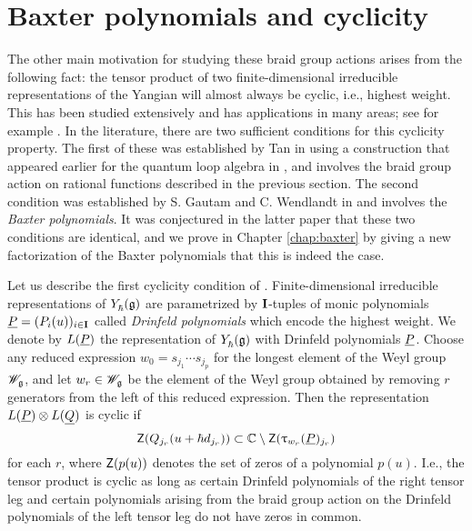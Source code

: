 \section{Baxter polynomials and cyclicity}

The other main motivation for studying these braid group actions arises from the following fact: the tensor product of two finite-dimensional irreducible representations of the Yangian will almost always be cyclic, i.e., highest weight.
This has been studied extensively and has applications in many areas; see for example \cite{chari_yangians_1996, guay_local_2015, molev_yangians_2007, nazarov_irreducibility_2002, akasaka_finite_1997}.
In the literature, there are two sufficient conditions for this cyclicity property.
The first of these was established by Tan in \cite{tan_braid_2015} using a construction that appeared earlier for the quantum loop algebra in \cite{chari_braid_2002}, and involves the braid group action on rational functions described in the previous section.
The second condition was established by S. Gautam and C. Wendlandt in \cite{gautam_poles_2023} and involves the \emph{Baxter polynomials}.
It was conjectured in the latter paper that these two conditions are identical, and we prove in Chapter \ref{chap:baxter} by giving a new factorization of the Baxter polynomials that this is indeed the case.

Let us describe the first cyclicity condition of \cite{tan_braid_2015}.
Finite-dimensional irreducible representations of $Y_\hbar^{}(\mathfrak{g})$ are parametrized by $\mathbf{I}$-tuples of monic polynomials $\underline{P}=(P_i(u))_{i\in\mathbf{I}}$ called \emph{Drinfeld polynomials} which encode the highest weight.
We denote by $L(\underline{P})$ the representation of $Y_\hbar^{}(\mathfrak{g})$ with Drinfeld polynomials $\underline{P}$.
Choose any reduced expression $w_0 = s_{j_1}\cdots s_{j_p}$ for the longest element of the Weyl group $\mathscr{W}_{\mathfrak{g}}$, and let $w_r\in\mathscr{W}_{\mathfrak{g}}$ be the element of the Weyl group obtained by removing $r$ generators from the left of this reduced expression.
Then the representation $L(\underline{P})\otimes L(\underline{Q})$ is cyclic if
\[\mathsf{Z}(Q_{j_r}(u+\hbar d_{j_r}))\subset\mathbb{C}\setminus\mathsf{Z}(\uptau_{w_r}(\underline{P})_{j_r})\]
for each $r$, where $\mathsf{Z}(p(u))$ denotes the set of zeros of a polynomial $p(u)$.
I.e., the tensor product is cyclic as long as certain Drinfeld polynomials of the right tensor leg and certain polynomials arising from the braid group action on the Drinfeld polynomials of the left tensor leg do not have zeros in common.

